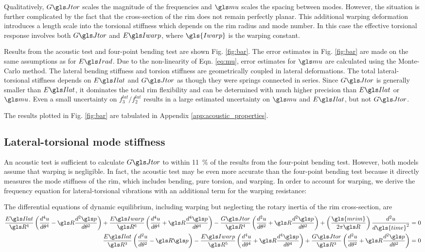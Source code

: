 \documentclass[../thesis.tex]{subfiles}
\begin{document}
Qualitatively, $\GJ$ scales the magnitude of the frequencies and $\m$ scales the spacing between modes. However, the situation is further complicated by the fact that the cross-section of the rim does not remain perfectly planar. This additional warping deformation introduces a length scale into the torsional stiffness which depends on the rim radius and mode number. In this case the effective torsional response involves both $\GJ$ and $\EIw$, where $\gls{Iwarp}$ is the warping constant.

Results from the acoustic test and four-point bending test are shown Fig. \ref{fig:bar}. The error estimates in Fig. \ref{fig:bar} are made on the same assumptions as for $\EIr$. Due to the non-linearity of Eqn. \eqref{eq:mu}, error estimates for $\m$ are calculated using the Monte-Carlo method. The lateral bending stiffness and torsion stiffness are geometrically coupled in lateral deformations. The total lateral-torsional stiffness depends on $\EIl$ and $\GJ$ as though they were springs connected in series. Since $\GJ$ is generally smaller than $\EIl$, it dominates the total rim flexibility and can be determined with much higher precision than $\EIl$ or $\m$. Even a small uncertainty on $f_3^{lat}/f_2^{lat}$ results in a large estimated uncertainty on $\m$ and $\EIl$, but not $\GJ$.

The results plotted in Fig. \ref{fig:bar} are tabulated in Appendix \ref{app:acoustic_properties}.

\subsection{Lateral-torsional mode stiffness}
An acoustic test is sufficient to calculate $\GJ$ to within \SI{11}{\percent} of the results from the four-point bending test. However, both models assume that warping is negligible. In fact, the acoustic test may be even more accurate than the four-point bending test because it directly measures the mode stiffness of the rim, which includes bending, pure torsion, and warping. In order to account for warping, we derive the frequency equation for lateral-torsional vibrations with an additional term for the warping resistance:

The differential equations of dynamic equilibrium, including warping but neglecting the rotary inertia of the rim cross-section, are
\begin{subequations}\label{eq:lat_eq}
\begin{align}
\frac{\EIl}{\R^4}\left(\dt{u}{4} - \R\dt{\p}{2}\right) +
\frac{\EIw}{\R^6} \left(\dt{u}{4} + \R\dt{\p}{4}\right) -
\frac{\GJ}{\R^4}\left(\dt{u}{2} + \R\dt{\p}{2}\right) +
\left(\frac{\gls{mrim}}{2\pi \R}\right) \frac{d^2u}{d\gls{time}^2} = 0\\
\frac{\EIl}{\R^3}\left(\dt{u}{2} - \R\p\right) -
\frac{\EIw}{\R^5}\left(\dt{u}{4} + \R\dt{\p}{4}\right) +
\frac{\GJ}{\R^3}\left(\dt{u}{2} + \R\dt{\p}{2}\right) = 0
\end{align}
\end{subequations}
\end{document}
